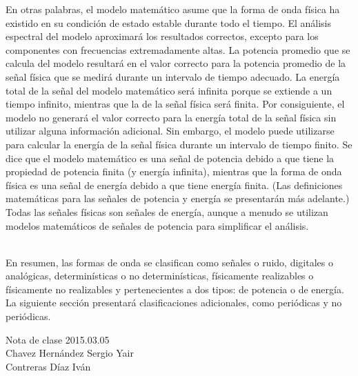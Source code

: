 En otras palabras, el modelo matemático asume que la forma de onda física ha existido en su
condición de estado estable durante todo el tiempo. El análisis espectral del modelo aproximará los
resultados correctos, excepto para los componentes con frecuencias extremadamente altas. La potencia 
promedio que se calcula del modelo resultará en el valor correcto para la potencia promedio de
la señal física que se medirá durante un intervalo de tiempo adecuado. La energía total de la señal
del modelo matemático será infinita porque se extiende a un tiempo infinito, mientras que la de la
señal física será finita. Por consiguiente, el modelo no generará el valor correcto para la energía 
total de la señal física sin utilizar alguna información adicional. Sin embargo, el modelo puede 
utilizarse para calcular la energía de la señal física durante un intervalo de tiempo finito. 
Se dice que el modelo matemático es una señal de potencia debido a que tiene la propiedad de 
potencia finita (y energía infinita), mientras que la forma de onda física es una señal de energía 
debido a que tiene energía finita. (Las definiciones matemáticas para las señales de potencia y 
energía se presentarán 
más adelante.) Todas las señales físicas son señales de energía, aunque a menudo se utilizan 
modelos matemáticos de señales de potencia para simplificar el análisis. 
\ \\\ \\
\par
En resumen, las formas de onda se clasifican como señales o ruido, digitales o analógicas, 
determinísticas o no determinísticas, físicamente realizables o físicamente no realizables y 
pertenecientes a dos tipos: de potencia o de energía. La siguiente sección presentará 
clasificaciones adicionales, como periódicas y no periódicas.\par
\noindent Nota de clase 2015.03.05\\
\noindent Chavez Hernández Sergio Yair\\
\noindent Contreras Díaz Iván\\





